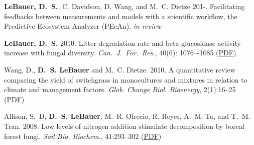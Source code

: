 \documentclass[11pt,twoside]{article}
\begin{document}
\begin{itemize*}



\item \noindent%
\textbf{LeBauer, D.~S.}, C. Davidson, D. Wang, and M.~C. Dietze 201-. Facilitating feedbacks between measurements and models with a scientific workflow, the Predictive Ecosystem Analyzer (PEcAn). \textit{in review}

\item \noindent%
\textbf{LeBauer, D.~S.} 2010. Litter degradation rate and beta-glucosidase activity increase with fungal diversity. \textit{Can.\ J.\ For.\ Res.}, 40(6): 1076–-1085
\ifpdf %
(\href{https://netfiles.uiuc.edu/dlebauer/www/lebauer2010ldr.pdf}{PDF})
\fi %

\item \noindent%
Wang, D., \textbf{D.~S. LeBauer} and M.~C. Dietze. 2010. A quantitative review comparing the yield of
switchgrass in monocultures and mixtures in relation to climate and management factors. \textit{Glob.
Change Biol. Bioenergy}, 2(1):16--25
\ifpdf %
(\href{https://netfiles.uiuc.edu/dlebauer/www/wang2010qrc.pdf}{PDF})
\fi %

\item \noindent%
Allison, S.~D, \textbf{D.~S. LeBauer}, M.~R. Ofrecio, R. Reyes, A.~M. Ta, and T.~M. Tran. 2008. Low levels of
nitrogen addition stimulate decomposition by boreal forest fungi. \textit{Soil Bio. Biochem.}, 41:293--302
\ifpdf %
(\href{https://netfiles.uiuc.edu/dlebauer/www/allison2009qrc.pdf}{PDF})
\fi %


\end{itemize*}
\end{document}
